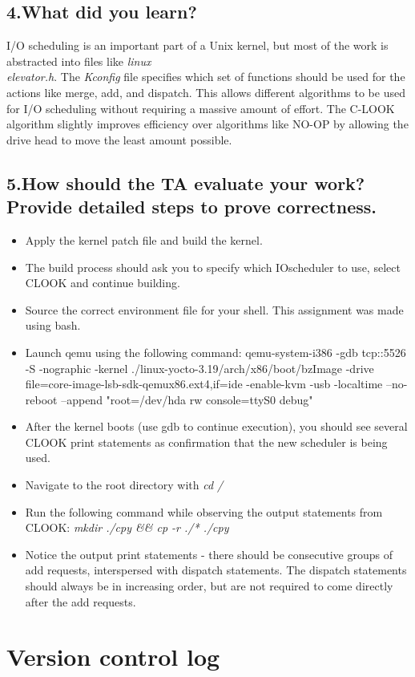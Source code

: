 \documentclass[letterpaper,10pt,fleqn]{article}
\begin{document}
	\subsection*{4.What did you learn?}
	I/O scheduling is an important part of a Unix kernel, but most of the work is abstracted into files like \textit{linux\\elevator.h}.
	The \textit{Kconfig} file specifies which set of functions should be used for the actions like merge, add, and dispatch.
	This allows different algorithms to be used for I/O scheduling without requiring a massive amount of effort.
	The C-LOOK algorithm slightly improves efficiency over algorithms like NO-OP by allowing the drive head to move the least amount possible.

	\subsection*{5.How should the TA evaluate your work? Provide detailed steps to prove correctness.}
	\begin{itemize}
		\item Apply the kernel patch file and build the kernel.
		\item The build process should ask you to specify which IOscheduler to use, select CLOOK and continue building.
		\item Source the correct environment file for your shell. This assignment was made using bash.
		\item Launch qemu using the following command:
		qemu-system-i386 -gdb tcp::5526 -S -nographic -kernel ./linux-yocto-3.19/arch/x86/boot/bzImage -drive file=core-image-lsb-sdk-qemux86.ext4,if=ide -enable-kvm -usb -localtime --no-reboot --append "root=/dev/hda rw console=ttyS0 debug"

		\item After the kernel boots (use gdb to continue execution), you should see several CLOOK print statements as confirmation that the new scheduler is being used.
		\item Navigate to the root directory with \textit{cd /}
		\item Run the following command while observing the output statements from CLOOK: \textit{mkdir ./cpy \&\& cp -r ./* ./cpy}
		\item Notice the output print statements - there should be consecutive groups of add requests, interspersed with dispatch statements.
		The dispatch statements should always be in increasing order, but are not required to come directly after the add requests.
	\end{itemize}

	\section*{Version control log}
\end{document}
